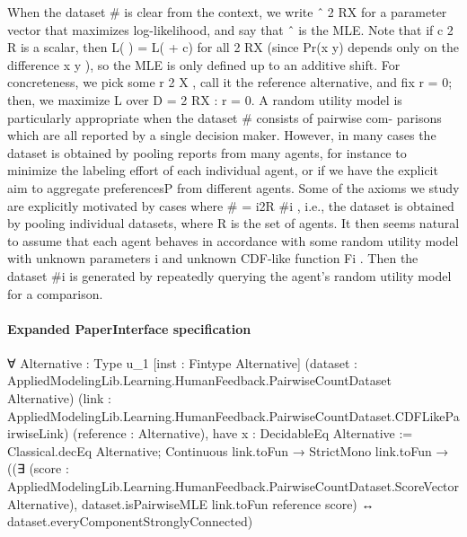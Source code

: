 \documentclass[10pt]{article}
\begin{document}
\begin{ReviewVerbatim}
When the dataset # is clear from the context, we write ˆ 2 RX for a parameter vector that maximizes
log-likelihood, and say that ˆ is the MLE. Note that if c 2 R is a scalar, then L( ) = L( + c) for
all 2 RX (since Pr(x y) depends only on the difference x              y ), so the MLE is only defined
up to an additive shift. For concreteness, we pick some r 2 X , call it the reference alternative, and
fix r = 0; then, we maximize L over D = { 2 RX : r = 0}.
A random utility model is particularly appropriate when the dataset # consists of pairwise com-
parisons which are all reported by a single decision maker. However, in many cases the dataset is
obtained by pooling reports from many agents, for instance to minimize the labeling effort of each
individual agent, or if we have the explicit aim to aggregate preferencesP from different agents. Some
of the axioms we study are explicitly motivated by cases where # = i2R #i , i.e., the dataset is
obtained by pooling individual datasets, where R is the set of agents. It then seems natural to assume
that each agent behaves in accordance with some random utility model with unknown parameters i
and unknown CDF-like function Fi . Then the dataset #i is generated by repeatedly querying the
agent’s random utility model for a comparison.
\end{ReviewVerbatim}



\paragraph{Expanded PaperInterface specification}
\begin{ReviewVerbatim}
∀ {Alternative : Type u_1} [inst : Fintype Alternative]
  (dataset : AppliedModelingLib.Learning.HumanFeedback.PairwiseCountDataset Alternative)
  (link : AppliedModelingLib.Learning.HumanFeedback.PairwiseCountDataset.CDFLikePairwiseLink) (reference : Alternative),
  have x : DecidableEq Alternative := Classical.decEq Alternative;
  Continuous link.toFun →
    StrictMono link.toFun →
      ((∃ (score : AppliedModelingLib.Learning.HumanFeedback.PairwiseCountDataset.ScoreVector Alternative),
          dataset.isPairwiseMLE link.toFun reference score) ↔
        dataset.everyComponentStronglyConnected)
\end{ReviewVerbatim}
\end{document}
